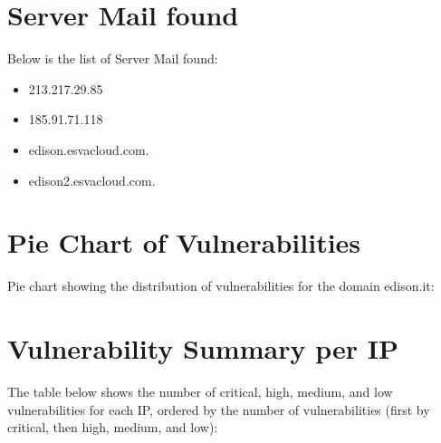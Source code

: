 \documentclass{article}
\begin{document}
\section*{Server Mail found}

Below is the list of Server Mail found:

\begin{itemize}
    
        \item 213.217.29.85
    
        \item 185.91.71.118
    
        \item edison.esvacloud.com.
    
        \item edison2.esvacloud.com.
    
\end{itemize}

\section*{Pie Chart of Vulnerabilities}

\noindent Pie chart showing the distribution of vulnerabilities for the domain \ttfamily edison.it:

\begin{figure}[H]
    \centering
\end{figure}

\section*{Vulnerability Summary per IP}

\noindent The table below shows the number of critical, high, medium, and low vulnerabilities for each IP, ordered by the number of vulnerabilities (first by critical, then high, medium, and low):
\end{document}
